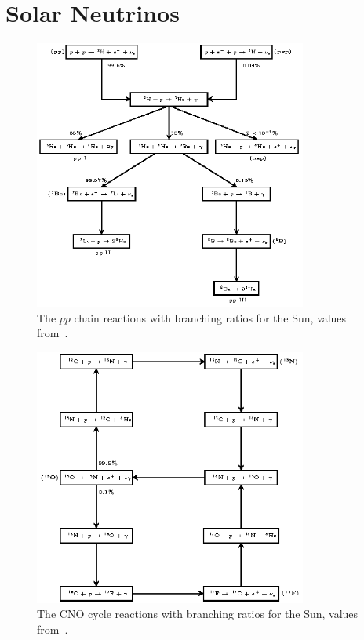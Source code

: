 
\section{Solar Neutrinos}
\begin{figure}[htbp]
\centering
\includegraphics[width=0.8\textwidth]{pp_chain}
\caption[$pp$ Chain Solar Reactions]{The $pp$ chain reactions with
branching ratios for the Sun, values from~\citep{bahcall_book}.}
\label{fig:pp_chain}
\end{figure}
\begin{figure}[htbp]
\centering
\includegraphics[width=0.8\textwidth]{cno_cycle}
\caption[CNO Cycle Solar Reactions]{The CNO cycle reactions with
branching ratios for the Sun, values from~\citep{bahcall_book}.}
\label{fig:cno_cycle}
\end{figure}
